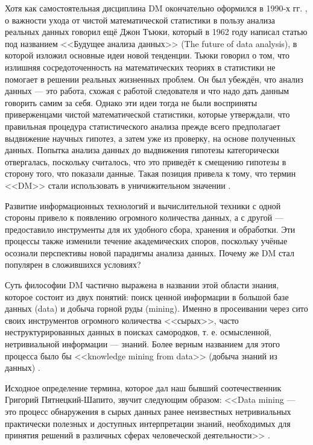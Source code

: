 Хотя как самостоятельная дисциплина DM окончательно оформился в 1990-х гг. \cite[стр. 15]{handbook_stat_dm}, о важности ухода от чистой математической статистики в пользу анализа реальных данных говорил ещё Джон Тъюки, который в 1962 году написал статью под названием <<Будущее анализа данных>> (The future of data analysis), в которой изложил основные идеи новой тенденции. Тьюки говорил о том, что излишняя сосредоточенность на математических теориях в статистики не помогает в решении реальных жизненных проблем. Он был убеждён, что анализ данных --- это работа, схожая с работой следователя и что надо дать данным говорить самим за себя. Однако эти идеи тогда не были восприняты приверженцами чистой математической статистики, которые утверждали, что правильная процедура статистического анализа прежде всего предполагает выдвижение научных гипотез, а затем уже из проверку, на основе полученных данных. Попытка анализа данных до выдвижения гипотезы категорически отвергалась, поскольку считалось, что это приведёт к смещению гипотезы в сторону того, что показали данные. Такая позиция привела к тому, что термин <<DM>> стали использовать в уничижительном значении \cite[стр. 788]{HandbookCS}.

Развитие информационных технологий и вычислительной техники с одной стороны привело к появлению огромного количества данных, а с другой --- предоставило инструменты для их удобного сбора, хранения и обработки. Эти процессы также изменили течение академических споров, поскольку учёные осознали перспективы новой парадигмы анализа данных. Почему же DM стал популярен в сложившихся условиях?

Суть философии DM частично выражена в названии этой области знания, которое состоит из двух понятий: поиск ценной информации в большой базе данных (data) и добыча горной руды (mining). Именно в просеивании через сито своих инструментов огромного количества <<сырых>>, часто неструктурированных данных в поисках самородков, т. е. осмысленной, нетривиальной информации --- знаний. Более верным названием для этого процесса было бы <<knowledge mining from data>> (добыча знаний из данных) \cite[стр. 5]{Han2006}.

Исходное определение термина, которое дал наш бывший соотечественник Григорий Пятнецкий-Шапито, звучит следующим образом: <<Data mining --- это процесс обнаружения в сырых данных ранее неизвестных нетривиальных практически полезных и доступных интерпретации знаний, необходимых для принятия решений в различных сферах человеческой деятельности>> \cite[стр. 78]{Duk2011}.

